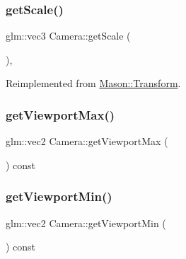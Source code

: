 \hypertarget{class_mason_1_1_camera_a405b26eaaae2ab7a460dfc319a9d16ea}{}\label{class_mason_1_1_camera_a405b26eaaae2ab7a460dfc319a9d16ea} 
\subsubsection{\texorpdfstring{get\+Scale()}{getScale()}}
{\footnotesize\ttfamily glm\+::vec3 Camera\+::get\+Scale (\begin{DoxyParamCaption}{ }\end{DoxyParamCaption})\hspace{0.3cm}{\ttfamily [override]}, {\ttfamily [virtual]}}



Reimplemented from \hyperlink{class_mason_1_1_transform_a24107560725b250c4c2e10ab98a6ac04}{Mason\+::\+Transform}.

\hypertarget{class_mason_1_1_camera_abe43550148e85f5a32919a3c8b8ff115}{}\label{class_mason_1_1_camera_abe43550148e85f5a32919a3c8b8ff115} 
\subsubsection{\texorpdfstring{get\+Viewport\+Max()}{getViewportMax()}}
{\footnotesize\ttfamily glm\+::vec2 Camera\+::get\+Viewport\+Max (\begin{DoxyParamCaption}{ }\end{DoxyParamCaption}) const}

\hypertarget{class_mason_1_1_camera_a0d2d26d8b7b80ab508ed4f4f537614b5}{}\label{class_mason_1_1_camera_a0d2d26d8b7b80ab508ed4f4f537614b5} 
\subsubsection{\texorpdfstring{get\+Viewport\+Min()}{getViewportMin()}}
{\footnotesize\ttfamily glm\+::vec2 Camera\+::get\+Viewport\+Min (\begin{DoxyParamCaption}{ }\end{DoxyParamCaption}) const}

\hypertarget{class_mason_1_1_camera_a69f184af46d081b85209040bbe814cbb}{}\label{class_mason_1_1_camera_a69f184af46d081b85209040bbe814cbb} 
